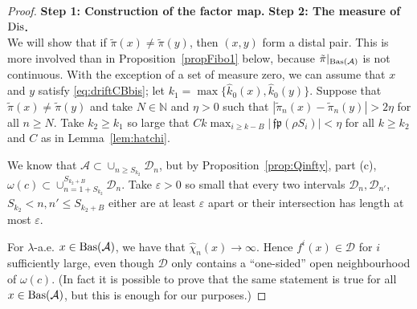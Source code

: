 \documentclass[12pt, psamsfonts, reqno]{amsart}
\begin{document}
\begin{proof} {\bf Step 1: Construction of the factor map.}
{\bf Step 2: The measure of \boldmath ${\mathop{\rm Dis}\nolimits}$. \unboldmath}\\
We will show that if $\tilde \pi(x) \neq \tilde \pi(y)$, then
$(x,y)$ form a distal pair. This is more involved than in
Proposition~\ref{propFibo1} below, because $\tilde
\pi|_{{\mathop{\rm Bas}\nolimits}({{\mathcal A}})}$ is not continuous. With the exception of a set of
measure zero, we can assume that $x$ and $y$ satisfy
\eqref{eq:driftCBbis}; let $k_1 = \max\{ \hat k_0(x),\hat k_0(y)
\}$. Suppose that $\tilde \pi(x) \neq \tilde \pi(y)$ and take $N
\in {{\mathbb N}}$ and $\eta > 0$ such that $|\tilde \pi_n(x) - \tilde
\pi_n(y)|
> 2 \eta$ for all $n \geq N$. \iffalse Let
\[
L_n := \big\{ \big( \sum_k e_k {\,\mathfrak{fp}}( \rho S_k ) \big) \bmod 1 : e
\in E, e_j = \langle n \rangle_j \text{ for all } j \text{ with }
S_j \leq n \big\}
\]
be the images of the cylinder sets.
Clearly $|L_n| \to 0$ as $n \to \infty$.
\fi
Take $k_2 \geq k_1$ so large that
$C k \max_{i \geq k-B} | {\,\mathfrak{fp}}( \rho S_i ) | < \eta$
for all $k \geq k_2$ and $C$ as in Lemma~\ref{lem:hatchi}.

We know that ${{\mathcal A}} \subset \cup_{n \geq S_{k_2}} {{\mathcal D}}_n$, but by
Proposition~\ref{prop:Qinfty}, part (c),
$\omega(c) \subset \cup_{n = 1+S_{k_2}}^{S_{k_2+B}}
{{\mathcal D}}_n$. Take ${\varepsilon} > 0$ so small that every two intervals
${{\mathcal D}}_n,{{\mathcal D}}_{n'}$, $S_{k_2}< n, n' \leq S_{k_2+B}$ either are at least
${\varepsilon}$ apart or their intersection has length at most ${\varepsilon}$.

\iffalse For every $x \in {\mathop{\rm Bas}\nolimits}({{\mathcal A}})$, $f^i(x) \in \mathcal D$ for
$i$ sufficiently large, even though $\mathcal D$ is to some extent
only a one-sided closed neighborhood of ${{\mathcal A}}$. The reason is that
$f^n$ assumes a local extremum of $c_n$ at $c$, and if $i$ is such
that $f^{i}(x) \in Z_{S_{k_2}}^\pm(c)$, then all iterates
$f^{i+S_{k_2}+j}(x)$ lie on that side of the point $c_{S_{k_2}+j}$
that is covered by $\mathcal D$. \footnote{HB: At the moment I
don't know how to rewrite this paragraph. The point is that if $y$
is a point that basically ``climb'' in the Hofbauer tower, it will
eventually not leave sets of the type ${{\mathcal D}}$ anymore, and every
point attracted to $\omega(c)$ will eventually enter ${{\mathcal D}}$, even
though ${{\mathcal D}}$ only contains a ``one-sided'' open neighbourhood of
$\omega(c)$.} \fi

For $\lambda$-a.e. $x \in {\mathop{\rm Bas}\nolimits}({{\mathcal A}})$, we have that
$\hat\chi_n(x)\to \infty$. Hence $f^i(x) \in \mathcal D$ for $i$
sufficiently large, even though ${{\mathcal D}}$ only contains a
``one-sided'' open neighbourhood of $\omega(c)$. (In fact it is
possible to prove that the same statement is true for all $x \in
{\mathop{\rm Bas}\nolimits}({{\mathcal A}})$, but this is enough for our purposes.)


\end{proof}
\end{document}
